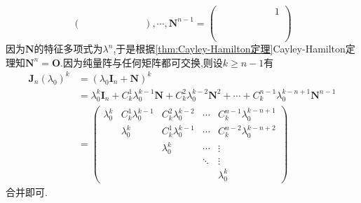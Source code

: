 {\begin{solution}
\[\begin{pmatrix}
                 &  &   &   &        &   &     \\
                 &  &   &   &        &   &   &
            \end{pmatrix},\cdots,\bm{N}^{n-1}=\begin{pmatrix}
                 &  &  &  &  &  &  & 1 \\
                \\
                \\
                \\
                \\
                \\
            \end{pmatrix}
        \]因为$\bm{N}$的特征多项式为$\lambda^n$,于是根据\cref{thm:Cayley-Hamilton定理}Cayley-Hamilton定理知$\bm{N}^n=\bm{O}.$因为纯量阵与任何矩阵都可交换,则设$k\geqslant n-1$有\begin{align*}
            \bm{J}_n\left(\lambda_0\right)^k & =\left(\lambda_0\bm{I}_n+\bm{N}\right)^k                                                                                   \\
                                             & =\lambda_0^k\bm{I}_n+C_k^1\lambda_0^{k-1}\bm{N}+C_k^2\lambda_0^{k-2}\bm{N}^2+\cdots+C_k^{n-1}\lambda_0^{k-n+1}\bm{N}^{n-1} \\
                                             & =\begin{pmatrix}
                                                    \lambda_0^k & C_k^1\lambda_0^{k-1} & C_k^2\lambda_0^{k-2} & \cdots & C_k^{n-1}\lambda_0^{k-n+1} \\
                                                                & \lambda_0^k          & C_k^1\lambda_0^{k-1} & \cdots & C_k^{n-2}\lambda_0^{k-n+2} \\
                                                                &                      & \lambda_0^k          & \cdots & \vdots                     \\
                                                                &                      &                      & \ddots & \vdots                     \\
                                                                &                      &                      &        & \lambda_0^k
                                                \end{pmatrix}
        \end{align*}合并即可.
    \end{solution}
}

